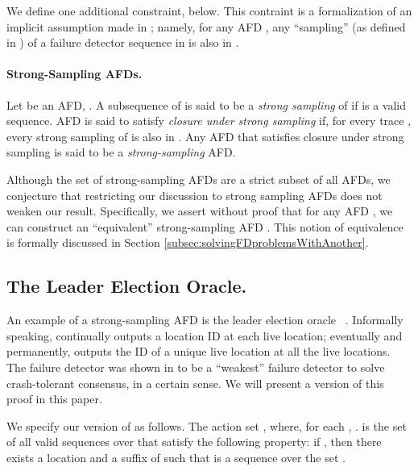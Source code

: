 \documentclass[11pt]{article}
\numberwithin{theorem}{section}
\begin{document}
We define one additional constraint, below.
This contraint is a formalization of an implicit assumption made in 
\cite{chan:twfdf}; namely, for any AFD , any ``sampling'' (as
defined in \cite{char:isolt}) of a failure detector sequence in 
is also in . 


\paragraph{Strong-Sampling AFDs.}
Let  be an AFD, . 
A subsequence  of  is said to be a \emph{strong sampling} of
 if  is a valid sequence.
AFD  is said to satisfy \emph{closure under strong sampling} if,
for every trace , every strong sampling of  is also in
. Any AFD that satisfies closure under strong sampling is said to
be a \emph{strong-sampling} AFD.

Although the set of strong-sampling AFDs are a strict subset of all AFDs, we conjecture that restricting our discussion to strong sampling AFDs does not weaken our result. Specifically, we assert without proof that for any AFD , we can construct an ``equivalent'' strong-sampling AFD . This notion of equivalence is formally discussed in  Section \ref{subsec:solvingFDproblemsWithAnother}.





\subsection{The Leader Election Oracle.} 
\label{subset:omegaDef}

An example of a strong-sampling AFD is the leader election oracle
~\cite{chan:twfdf}.
Informally speaking,  continually outputs a location ID at
each live location; eventually and permanently,  outputs the
ID of a unique live location at all the live locations.
The  failure detector was shown in \cite{chan:twfdf} to be a
``weakest'' failure detector to solve crash-tolerant consensus, in a
certain sense. 
We will present a version of this proof in this paper.

We specify our version  of 
as follows.
The action set , where, for
each , . 
 is the set of all valid sequences  over  that satisfy the following property:  
if , then there exists a location  and a suffix  of  such that
 is a sequence over the set .
\end{document}
